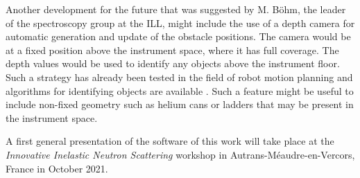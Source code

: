 Another development for the future that was suggested by M. B\"ohm, the leader of the spectroscopy 
group at the ILL, might include the use of a depth camera for automatic generation and update 
of the obstacle positions. The camera would be at a fixed position above the instrument
space, where it has full coverage. The depth values would be used to identify any objects above the
instrument floor. Such a strategy has already been tested in the field of robot motion planning and 
algorithms for identifying objects are available \cite{Biswas2012}.
Such a feature might be useful to include non-fixed geometry such as helium cans or ladders
that may be present in the instrument space.

A first general presentation of the software of this work will take place at the 
\textit{Innovative Inelastic Neutron Scattering} workshop in Autrans-M\'eaudre-en-Vercors, France 
in October 2021.
